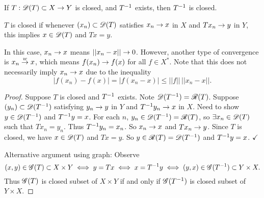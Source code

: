 \documentclass[]{article}
\begin{document}
\begin{theorem}
	If $T:\mathscr{D}(T)\subset X\rightarrow Y$ is closed, and $T^{-1}$ exists, then $T^{-1}$ is closed.
\end{theorem}
\begin{note}
	$T$ is closed if whenever $(x_n)\subset\mathscr{D}(T)$ satisfies $x_n\rightarrow x$ in $X$ and $Tx_n\rightarrow y$ in $Y$, this implies $x\in\mathscr{D}(T)$ and $Tx=y$.
\end{note}
\begin{remark}
	In this case, $x_n\rightarrow x$ means $||x_n-x||\rightarrow0$. 
	However, another type of convergence is $x_n\overset{w}{\rightarrow} x$, which means $f(x_n)\rightarrow f(x)$ for all $f\in X^*$. 
	Note that this does not necessarily imply $x_n\rightarrow x$ due to the inequality $$|f(x_n)-f(x)|=|f(x_n-x)| \leq ||f||\,||x_n-x||.$$
\end{remark}
\begin{proof}
	Suppose $T$ is closed and $T^{-1}$ exists. Note $\mathscr{D}(T^{-1}) = \mathscr{R}(T)$.
	Suppose $(y_n)\subset\mathscr{D}(T^{-1})$ satisfying $y_n\rightarrow y$ in $Y$ and $T^{-1} y_n\rightarrow x$ in $X$.
	Need to show $y\in\mathscr{D}(T^{-1})$ and $T^{-1} y=x$.
	For each $n$, $y_n\in\mathscr{D}(T^{-1})=\mathscr{R}(T)$, so $\exists x_n\in\mathscr{D}(T)$ such that $Tx_n=y_n$.
	Thus $T^{-1} y_n=x_n$. So $x_n\rightarrow x$ and $Tx_n\rightarrow y$. Since $T$ is closed, we have $x\in\mathscr{D}(T)$ and $Tx=y$.
	So $y\in\mathscr{R}(T)=\mathscr{D}(T^{-1})$ and $T^{-1} y=x$. $\checkmark$

	Alternative argument using graph:
	Observe $$(x,y)\in\mathscr{G}(T)\subset X\times Y\iff y=Tx \iff x=T^{-1} y \iff (y,x)\in\mathscr{G}(T^{-1})\subset Y\times X .$$
	Thus $\mathscr{G}(T)$ is closed subset of $X\times Y$ if and only if $\mathscr{G}(T^{-1})$ is closed subset of $Y\times X$.
\end{proof}
\end{document}
